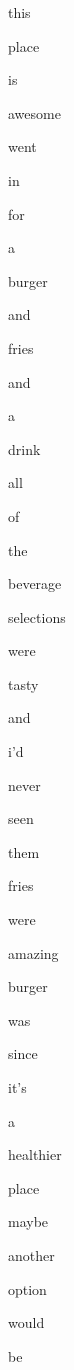 \documentclass[varwidth]{standalone}
\begin{document}
 \begin{CJK*}{UTF8}{gbsn} 
{\setlength{\fboxsep}{0pt}\colorbox{white!0}{\parbox{0.9\textwidth}{
\colorbox{red!0.10612012445926666}{\strut this} 
\colorbox{red!3.358499050140381}{\strut place} 
\colorbox{red!28.666364669799805}{\strut is} 
\colorbox{red!55.32655715942383}{\strut awesome} 
\colorbox{red!14.276517868041992}{\strut went} 
\colorbox{red!12.16701602935791}{\strut in} 
\colorbox{red!12.263842582702637}{\strut for} 
\colorbox{red!4.499917030334473}{\strut a} 
\colorbox{red!0.0}{\strut burger} 
\colorbox{red!4.523928642272949}{\strut and} 
\colorbox{red!1.5625853538513184}{\strut fries} 
\colorbox{red!2.7972829341888428}{\strut and} 
\colorbox{red!6.88913106918335}{\strut a} 
\colorbox{red!14.94902229309082}{\strut drink} 
\colorbox{red!33.01386260986328}{\strut all} 
\colorbox{red!36.02226257324219}{\strut of} 
\colorbox{red!26.44173812866211}{\strut the} 
\colorbox{red!25.872987747192383}{\strut beverage} 
\colorbox{red!29.504962921142578}{\strut selections} 
\colorbox{red!40.06765365600586}{\strut were} 
\colorbox{red!100.0}{\strut tasty} 
\colorbox{red!14.961913108825684}{\strut and} 
\colorbox{red!8.836142539978027}{\strut i'd} 
\colorbox{red!1.0014556646347046}{\strut never} 
\colorbox{red!5.463639259338379}{\strut seen} 
\colorbox{red!9.623061180114746}{\strut them} 
\colorbox{red!16.349506378173828}{\strut fries} 
\colorbox{red!24.33159637451172}{\strut were} 
\colorbox{red!50.942481994628906}{\strut amazing} 
\colorbox{red!57.15270233154297}{\strut burger} 
\colorbox{red!72.76256561279297}{\strut was} 
\colorbox{red!24.896087646484375}{\strut since} 
\colorbox{red!41.49093246459961}{\strut it's} 
\colorbox{red!49.05110168457031}{\strut a} 
\colorbox{red!34.74099349975586}{\strut healthier} 
\colorbox{red!25.159263610839844}{\strut place} 
\colorbox{red!5.859266757965088}{\strut maybe} 
\colorbox{red!17.2923526763916}{\strut another} 
\colorbox{red!27.22079849243164}{\strut option} 
\colorbox{red!29.475482940673828}{\strut would} 
\colorbox{red!8.556537628173828}{\strut be} 

}}}\end{CJK*}
\end{document}

